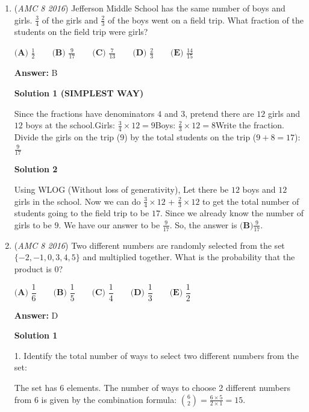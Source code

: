 \begin{enumerate}
 


	\item (\textit{AMC 8 2016}) Jefferson Middle School has the same number of boys and girls. $\frac{3}{4}$ of the girls and $\frac{2}{3}$
of the boys went on a field trip. What fraction of the students on the field trip were girls?


 $\textbf{(A) }\frac{1}{2}\qquad\textbf{(B) }\frac{9}{17}\qquad\textbf{(C) }\frac{7}{13}\qquad\textbf{(D) }\frac{2}{3}\qquad \textbf{(E) }\frac{14}{15}$

 \textbf{Answer: }B



\textbf{Solution 1 (SIMPLEST WAY)}

Since the fractions have denominators \(4\) and \(3\), pretend there are \(12\) girls and \(12\) boys at the school.Girls: \(\frac{3}{4} \times 12 = 9\)Boys: \(\frac{2}{3} \times 12 = 8\)Write the fraction. Divide the girls on the trip (\(9\)) by the total students on the trip (\(9 + 8 = 17\)):\(\frac{9}{17}\)

 



\textbf{Solution 2}

Using WLOG (Without loss of generativity), Let there be $12$ boys and $12$ girls in the school. Now we can do $\frac{3}{4}\times{12}$ + $\frac{2}{3}\times{12}$ to get the total number of students going to the field trip to be $17$. Since we already know the number of girls to be $9$. We have our answer to be $\frac{9}{17}$. So, the answer is $\boxed{\textbf{(B)} \frac{9}{17}}$.

 


	\item (\textit{AMC 8 2016}) Two different numbers are randomly selected from the set $\{ - 2, -1, 0, 3, 4, 5\}$ and multiplied together. What is the probability that the product is $0$?


 $\textbf{(A) }\dfrac{1}{6}\qquad\textbf{(B) }\dfrac{1}{5}\qquad\textbf{(C) }\dfrac{1}{4}\qquad\textbf{(D) }\dfrac{1}{3}\qquad \textbf{(E) }\dfrac{1}{2}$

 \textbf{Answer: }D



\textbf{Solution 1}

1. Identify the total number of ways to select two different numbers from the set:

 The set has 6 elements. The number of ways to choose 2 different numbers from 6 is given by the combination formula: $\binom{6}{2} = \frac{6 \times 5}{2 \times 1} = 15$.


\end{enumerate}

